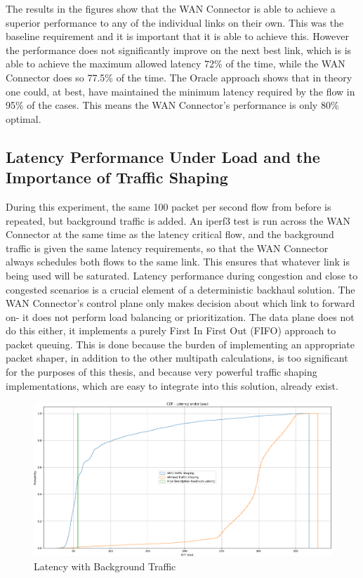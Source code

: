 The results in the figures show that the WAN Connector is able to achieve a superior performance to any of the individual links on their own. This was the baseline requirement and it is important that it is able to achieve this. However the performance does not significantly improve on the next best link, which is is able to achieve the maximum allowed latency 72\% of the time, while the WAN Connector does so 77.5\% of the time. The Oracle approach shows that in theory one could, at best, have maintained the minimum latency required by the flow in 95\% of the cases. This means the WAN Connector's performance is only 80\% optimal.


\subsection{Latency Performance Under Load and the Importance of Traffic Shaping}

During this experiment, the same 100 packet per second flow from before is repeated, but background traffic is added. An iperf3 test is run across the WAN Connector at the same time as the latency critical flow, and the background traffic is given the same latency requirements, so that the WAN Connector always schedules both flows to the same link. This ensures that whatever link is being used will be saturated. Latency performance during congestion and close to congested scenarios is a crucial element of a deterministic backhaul solution. The WAN Connector's control plane only makes decision about which link to forward on- it does not perform load balancing or prioritization. The data plane does not do this either, it implements a purely First In First Out (FIFO) approach to packet queuing. This is done because the burden of implementing an appropriate packet shaper, in addition to the other multipath calculations, is too significant for the purposes of this thesis, and because very powerful traffic shaping implementations, which are easy to integrate into this solution, already exist.

\begin{figure}[h]
    \centering
        \includegraphics[height=0.66\textwidth,width=\textwidth]{fig/rrul_cdf.png}
        \caption{Latency with Background Traffic}
        \label{fig:rrul_cdf}
\end{figure}

